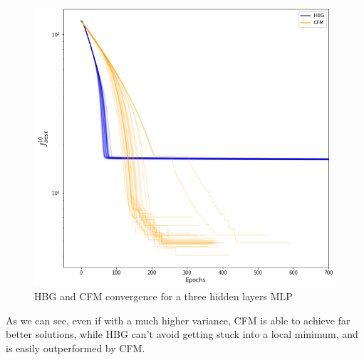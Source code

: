 \begin{figure}[htbp]
    \centering
    \includegraphics[width=.6\textwidth]{images/h3_relu.png}
    \caption{HBG and CFM convergence for a three hidden layers MLP}
    \label{fig:h3_relu}
\end{figure}

As we can see, even if with a much higher variance, CFM is able to achieve far better solutions, while HBG can't avoid getting stuck into a local minimum, and is easily outperformed by CFM.